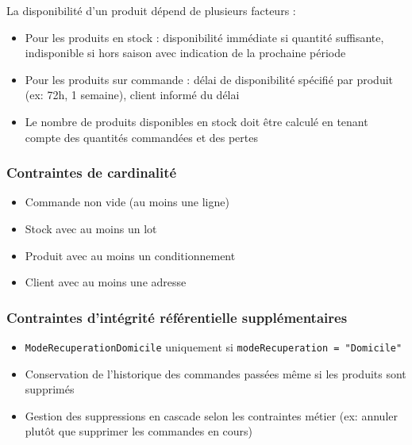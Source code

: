 La disponibilité d'un produit dépend de plusieurs facteurs :
\begin{itemize}
    \item Pour les produits en stock : disponibilité immédiate si quantité suffisante, indisponible si hors saison avec indication de la prochaine période
    \item Pour les produits sur commande : délai de disponibilité spécifié par produit (ex: 72h, 1 semaine), client informé du délai
    \item Le nombre de produits disponibles en stock doit être calculé en tenant compte des quantités commandées et des pertes
\end{itemize}

\subsubsection{Contraintes de cardinalité}

\begin{itemize}
    \item Commande non vide (au moins une ligne)
    \item Stock avec au moins un lot
    \item Produit avec au moins un conditionnement
    \item Client avec au moins une adresse
\end{itemize}

\subsubsection{Contraintes d'intégrité référentielle supplémentaires}

\begin{itemize}
    \item \texttt{ModeRecuperationDomicile} uniquement si \texttt{modeRecuperation = "Domicile"}
    \item Conservation de l'historique des commandes passées même si les produits sont supprimés
    \item Gestion des suppressions en cascade selon les contraintes métier (ex: annuler plutôt que supprimer les commandes en cours)
\end{itemize}
